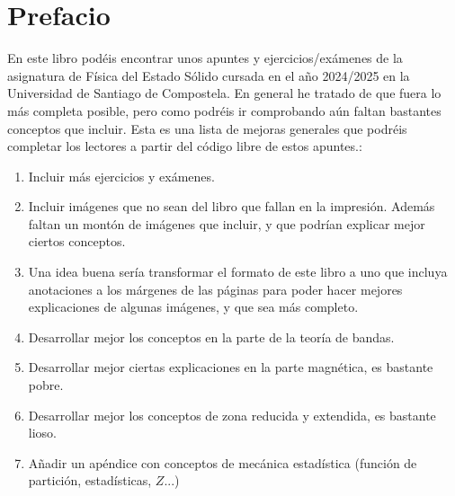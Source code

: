 \section*{Prefacio}
En este libro podéis encontrar unos apuntes y ejercicios/exámenes de la asignatura de Física del Estado Sólido cursada en el año 2024/2025 en la Universidad de Santiago de Compostela. En general he tratado de que fuera lo más completa posible, pero como podréis ir comprobando aún faltan bastantes conceptos que incluir. Esta es una lista de mejoras generales que podréis completar los lectores a partir del código libre de estos apuntes.:

\begin{enumerate}
	\item Incluir más ejercicios y exámenes.
	\item Incluir imágenes que no sean del libro que fallan en la impresión. Además faltan un montón de imágenes que incluir, y que podrían explicar mejor ciertos conceptos.
	\item Una idea buena sería transformar el formato de este libro a uno que incluya anotaciones a los márgenes de las páginas para poder hacer mejores explicaciones de algunas imágenes, y que sea más completo.
	\item Desarrollar mejor los conceptos en la parte de la teoría de bandas.
	\item Desarrollar mejor ciertas explicaciones en la parte magnética, es bastante pobre.
	\item Desarrollar mejor los conceptos de zona reducida y extendida, es bastante lioso.
	\item Añadir un apéndice con conceptos de mecánica estadística (función de partición, estadísticas, $Z$...)   
\end{enumerate}